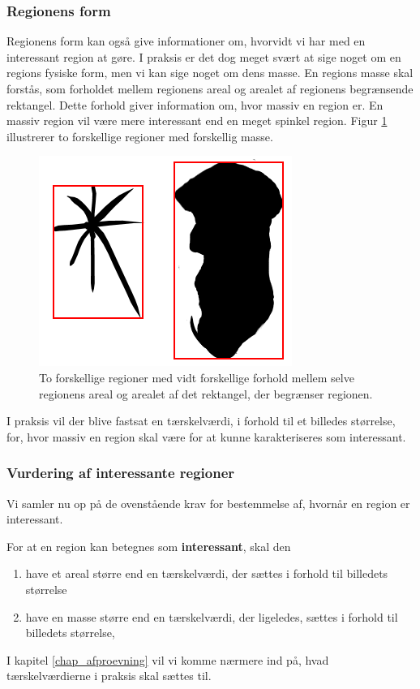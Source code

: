 {\subsubsection{Regionens form}
Regionens form kan også give informationer om, hvorvidt vi har med en
interessant region at gøre.  I praksis er det dog meget svært at sige
noget om en regions fysiske form, men vi kan sige noget om dens masse.
En regions masse skal forstås, som forholdet mellem regionens areal og
arealet af regionens begrænsende rektangel.  Dette forhold giver
information om, hvor massiv en region er.  En massiv region vil være
mere interessant end en meget spinkel region.  Figur \ref{region_mass}
illustrerer to forskellige regioner med forskellig masse.
\begin{figure}[h]
    \begin{center}
        \includegraphics[scale=\imgscale,angle=0]{afsnit/vores_implementation/billeder/naiv_algoritme/bbox_area_ratio}
    \end{center}
    \caption[Regioners masse]{To forskellige regioner med vidt forskellige forhold
    mellem selve regionens areal og arealet af det rektangel, der
    begrænser regionen.}
    \label{region_mass}
\end{figure}
I praksis vil der blive fastsat en tærskelværdi, i forhold til et
billedes størrelse, for, hvor massiv en region skal være for at kunne
karakteriseres som interessant.

\subsubsection{Vurdering af interessante regioner}
Vi samler nu op på de ovenstående krav for bestemmelse af, hvornår en
region er interessant.

\begin{definition}
    For at en region kan betegnes som \textbf{interessant}, skal den
    \begin{enumerate}
            \renewcommand{\labelenumi}{(\alph{enumi})}
        \item have et areal større end en tærskelværdi, der sættes i
            forhold til billedets størrelse
        \item have en masse større end en tærskelværdi, der ligeledes,
            sættes i forhold til billedets størrelse,
    \end{enumerate}
    \label{def_interessant}
\end{definition}
I kapitel \ref{chap_afproevning} vil vi komme nærmere ind på, hvad
tærskelværdierne i praksis skal sættes til.

}
